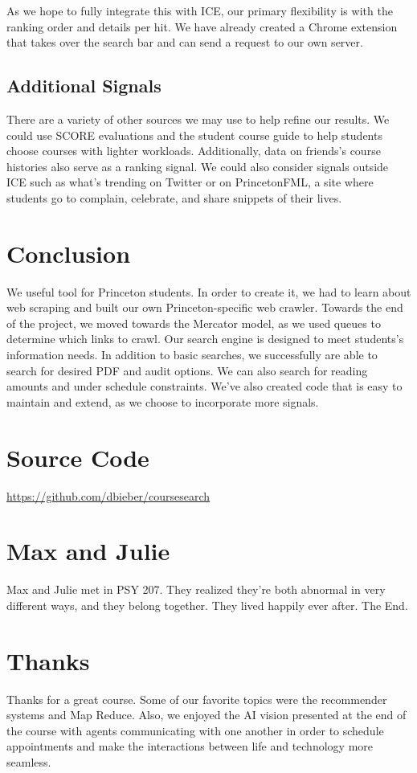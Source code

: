 \documentclass[12pt,letterpaper]{article}
\begin{document}
As we hope to fully integrate this with ICE, our primary flexibility is with the ranking order and details per hit. We have already created a Chrome extension that takes over the search bar and can send a request to our own server.  

\subsection{Additional Signals}

There are a variety of other sources we may use to help refine our results. We could use SCORE evaluations and the student course guide to help students choose courses with lighter workloads. Additionally, data on friends's course histories also serve as a ranking signal. We could also consider signals outside ICE such as what's trending on Twitter or on PrincetonFML, a site where students go to complain, celebrate, and share snippets of their lives. 

\section{Conclusion}

We useful tool for Princeton students. In order to create it, we had to learn about web scraping and built our own Princeton-specific web crawler. Towards the end of the project, we moved towards the Mercator model, as we used queues to determine which links to crawl. Our search engine is designed to meet students's information needs. In addition to basic searches, we successfully are able to search for desired PDF and audit options. We can also search for reading amounts and under schedule constraints. We've also created code that is easy to maintain and extend, as we choose to incorporate more signals.


\appendix

\section{Source Code}
\url{https://github.com/dbieber/coursesearch}

\section{Max and Julie}
Max and Julie met in PSY 207. They realized they're both abnormal in very different ways, and they belong together. They lived happily ever after. The End.

\section{Thanks}
Thanks for a great course. Some of our favorite topics were the recommender systems and Map Reduce. Also, we enjoyed the AI vision presented at the end of the course with agents communicating with one another in order to schedule appointments and make the interactions between life and technology more seamless.
\end{document}
